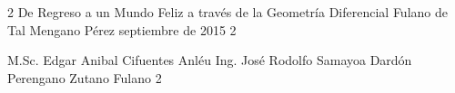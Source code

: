 \documentclass[letterpaper,12pt]{thesisECFM}
\theoremstyle{plain}
\theoremstyle{definition}
\theoremstyle{remark}
\begin{document}
\datosThesis%
{2}%
{De Regreso a un Mundo Feliz a través de la Geometría Diferencial}%
{Fulano de Tal}%
{Mengano Pérez}%
{septiembre de 2015}		%
{2}							%

\examenPrivado%
{M.Sc. Edgar Anibal Cifuentes Anléu}%
{Ing. José Rodolfo Samayoa Dardón}%
{Perengano}%
{Zutano}%
{Fulano 2}%

{\onehalfspacing	%




\par}
 
\frontmatter    %

{\onehalfspacing	%

\tableofcontents    %





\mainmatter     %




{\backmatter     %


\renewcommand{\bibname}{BIBLIOGRAF\'IA}
\nocite{*}			%

}


%

\par}               %
\end{document}
